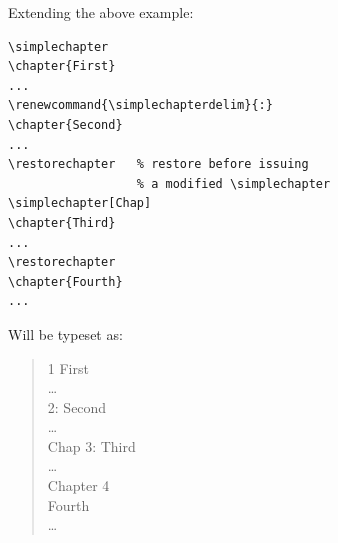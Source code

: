 \documentclass[a4paper]{article}
\begin{document}
\begin{samepage}
Extending the above example:
%
\begin{verbatim}
\simplechapter
\chapter{First}
...
\renewcommand{\simplechapterdelim}{:}
\chapter{Second}
...
\restorechapter   % restore before issuing
                  % a modified \simplechapter
\simplechapter[Chap]
\chapter{Third}
...
\restorechapter
\chapter{Fourth}
...
\end{verbatim}
%
Will be typeset as:
%
\begin{quote}
  1 First\\
  \ldots\\
  2: Second\\
  \ldots\\
  Chap 3: Third\\
  \ldots\\
  Chapter 4\\
  Fourth\\
  \ldots
\end{quote}
\end{samepage}
\end{document}
